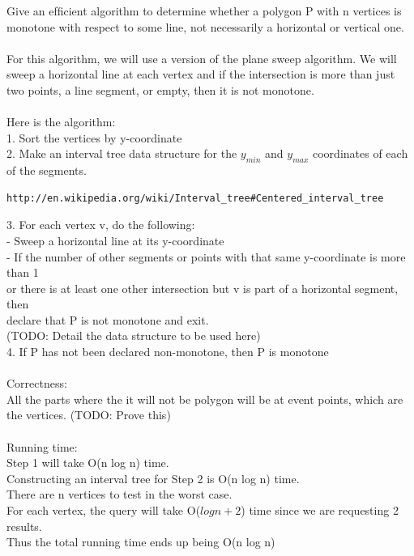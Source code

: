 \documentclass[11pt,psfig]{article}
\begin{document}
Give an efﬁcient algorithm to determine whether a polygon P with n
vertices is monotone with respect to some line, not necessarily a horizontal
or vertical one.\\
\\
For this algorithm, we will use a version of the plane sweep algorithm. We will sweep a horizontal line at each vertex and if the intersection is more than just two points, a line segment, or empty, then it is not monotone. \\
\\
Here is the algorithm:\\
1. Sort the vertices by y-coordinate\\
2. Make an interval tree data structure for the $y_{min}$ and $y_{max}$ coordinates of each of the segments. \\
\begin{verbatim}
http://en.wikipedia.org/wiki/Interval_tree#Centered_interval_tree
\end{verbatim}
3. For each vertex v, do the following:\\
- Sweep a horizontal line at its y-coordinate\\
- If the number of other segments or points with that same y-coordinate is more than 1\\
or there is at least one other intersection but v is part of a horizontal segment, then\\
declare that P is not monotone and exit.\\
(TODO: Detail the data structure to be used here)\\
4. If P has not been declared non-monotone, then P is monotone\\
\\
Correctness:\\
All the parts where the it will not be polygon will be at event points, which are the vertices. (TODO: Prove this)\\
\\
Running time: \\
Step 1 will take O(n log n) time. \\
Constructing an interval tree for Step 2 is O(n log n) time. \\
There are n vertices to test in the worst case. \\
For each vertex, the query will take O($log n + 2$) time since we are requesting 2 results. \\
Thus the total running time ends up being O(n log n)\\
\end{document}
